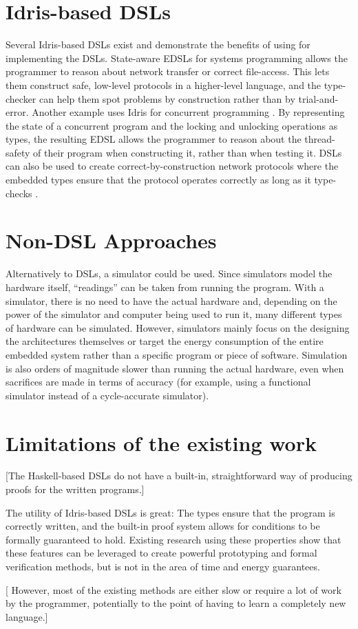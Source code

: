 \section{Idris-based DSLs}
	Several Idris-based DSLs exist and demonstrate the benefits of using \Idris for implementing the DSLs. State-aware EDSLs for systems programming \cite{10.1007/978-3-642-27694-1_18} allows the programmer to reason about network transfer or correct file-access. This lets them construct safe, low-level protocols in a higher-level language, and the type-checker can help them spot problems by construction \cite{10.1007/978-3-642-27694-1_18} rather than by trial-and-error.
	Another example uses Idris for concurrent programming \cite{brady2010correct}. By representing the state of a concurrent program and the locking and unlocking operations as types, the resulting EDSL allows the programmer to reason about the thread-safety of their program when constructing it, rather than when testing it.
	DSLs can also be used to create correct-by-construction network protocols where the embedded types ensure that the protocol operates correctly as long as it type-checks \cite{5158855}.

\section{Non-DSL Approaches}
	Alternatively to DSLs, a simulator could be used. Since simulators model the hardware itself, ``readings'' can be taken from running the program. With a simulator, there is no need to have the actual hardware and, depending on the power of the simulator and computer being used to run it, many different types of hardware can be simulated. However, simulators mainly focus on the designing the architectures themselves \cite{10.1007/3-540-46002-0_32,Lee:2008:FFC:1375657.1375670} or target the energy consumption of the entire embedded system \cite{782199} rather than a specific program or piece of software. Simulation is also orders of magnitude slower than running the actual hardware, even when sacrifices are made in terms of accuracy (for example, using a functional simulator instead of a cycle-accurate simulator).

\section{Limitations of the existing work}
	[The Haskell-based DSLs do not have a built-in, straightforward way of producing proofs for the written programs.]
	
	The utility of Idris-based DSLs is great: The types ensure that the program is correctly written, and the built-in proof system allows for conditions to be formally guaranteed to hold. Existing research using these properties \cite{5158855,brady2010correct,10.1007/978-3-642-27694-1_18} show that these features can be leveraged to create powerful prototyping and formal verification methods, but is not in the area of time and energy guarantees.
    
    [ However, most of the existing methods are either slow or require a lot of work by the programmer, potentially to the point of having to learn a completely new language.]
